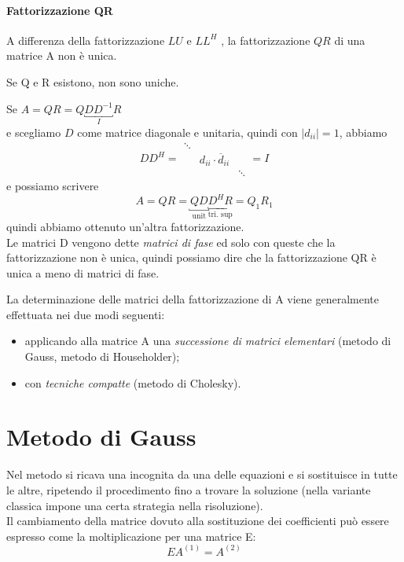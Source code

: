 \paragraph{Fattorizzazione QR}\label{fatt:QR}
A differenza della fattorizzazione $LU$ e $LL^H$ , la fattorizzazione $QR$ di
una matrice A non \`e unica. 

\begin{observation}
  Se Q e R esistono, non sono uniche.
\end{observation}
\begin{thproof}
  Se $A = QR = Q \underbracket{D D^{-1}}_{I} R$  \\
  e scegliamo $D$ come matrice diagonale e unitaria, quindi con $|d_{ii}| = 1$, abbiamo
  $$ D D^H = 
  \begin{array}{|ccc|}
    \ddots & & \\
    & d_{ii} \cdot \overline{d}_{ii} & \\
    & & \ddots
  \end{array}
  = I $$
e possiamo scrivere 
$$ A = QR = \underbracket{Q D}_{\text{unit}}
\underbracket{D^{H} R}_{\text{tri. sup}} = Q_1 R_1 $$
quindi abbiamo ottenuto un'altra fattorizzazione.\\
Le matrici D vengono dette \emph{matrici di fase} ed solo con queste
che la fattorizzazione non \`e unica, quindi possiamo dire che la
fattorizzazione QR \`e unica a meno di matrici di fase.
\end{thproof}


La determinazione delle matrici della fattorizzazione di A viene 
generalmente effettuata nei due modi seguenti:
\begin{itemize}
\item applicando alla matrice A una \emph{successione di matrici
    elementari}  (metodo di Gauss, metodo di Householder);
\item con \emph{tecniche compatte} (metodo di Cholesky).
\end{itemize}

\section{Metodo di Gauss}
Nel metodo si ricava una incognita da una delle equazioni e si
sostituisce in tutte le altre, ripetendo il procedimento fino a
trovare la soluzione (nella variante classica impone una certa
strategia nella risoluzione).\\
Il cambiamento della matrice dovuto alla sostituzione dei coefficienti
può essere espresso come la moltiplicazione per una matrice E:
$$ E A^{(1)} = A^{(2)} $$

